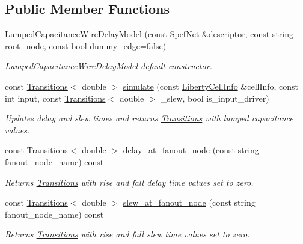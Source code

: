 \subsection*{Public Member Functions}
\begin{DoxyCompactItemize}
\item 
\hyperlink{classLumpedCapacitanceWireDelayModel_ae147cdba517e3f6152ed8234473e5443}{Lumped\-Capacitance\-Wire\-Delay\-Model} (const Spef\-Net \&descriptor, const string root\-\_\-node, const bool dummy\-\_\-edge=false)
\begin{DoxyCompactList}\small\item\em \hyperlink{classLumpedCapacitanceWireDelayModel}{Lumped\-Capacitance\-Wire\-Delay\-Model} default constructor. \end{DoxyCompactList}\item 
const \hyperlink{classTransitions}{Transitions}$<$ double $>$ \hyperlink{classLumpedCapacitanceWireDelayModel_a1bba0aef3bebe8df97a63e05b307b19a}{simulate} (const \hyperlink{structLibertyCellInfo}{Liberty\-Cell\-Info} \&cell\-Info, const int input, const \hyperlink{classTransitions}{Transitions}$<$ double $>$ \-\_\-slew, bool is\-\_\-input\-\_\-driver)
\begin{DoxyCompactList}\small\item\em Updates delay and slew times and returns \hyperlink{classTransitions}{Transitions} with lumped capacitance values. \end{DoxyCompactList}\item 
const \hyperlink{classTransitions}{Transitions}$<$ double $>$ \hyperlink{classLumpedCapacitanceWireDelayModel_a0266cb676908d95bdfcb64d1137898b0}{delay\-\_\-at\-\_\-fanout\-\_\-node} (const string fanout\-\_\-node\-\_\-name) const 
\begin{DoxyCompactList}\small\item\em Returns \hyperlink{classTransitions}{Transitions} with rise and fall delay time values set to zero. \end{DoxyCompactList}\item 
const \hyperlink{classTransitions}{Transitions}$<$ double $>$ \hyperlink{classLumpedCapacitanceWireDelayModel_aaedd69e811e7220e48493c51fb0443ed}{slew\-\_\-at\-\_\-fanout\-\_\-node} (const string fanout\-\_\-node\-\_\-name) const 
\begin{DoxyCompactList}\small\item\em Returns \hyperlink{classTransitions}{Transitions} with rise and fall slew time values set to zero. \end{DoxyCompactList}\item 

\end{DoxyCompactItemize}
